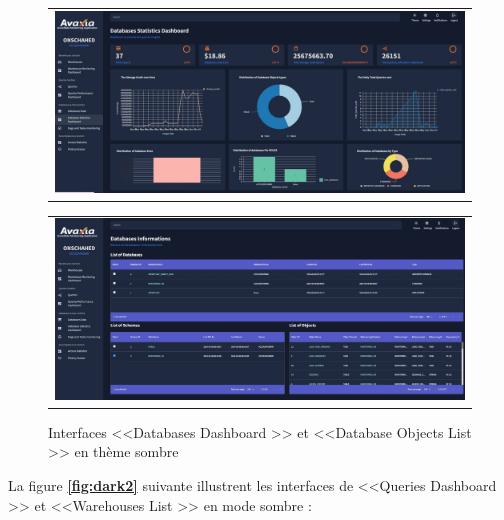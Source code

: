  \begin{figure}[H]
    \centering
    \begin{tabular}[b]{c}
        \includegraphics[width=1\linewidth ]{img/captures/dark/2.jpg}
        \end{tabular}
        \begin{tabular}[b]{c}
            \includegraphics[width=1\linewidth]{img/captures/dark/4.jpg}
            \end{tabular}
            \caption{Interfaces <<Databases Dashboard >> et <<Database Objects List >> en thème sombre}
            \label{fig:dark1}
\end{figure}
\newpage
\par La figure \textbf{\ref{fig:dark2}} suivante illustrent les interfaces de <<Queries Dashboard >> et <<Warehouses List >> en mode sombre :
